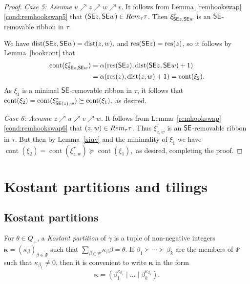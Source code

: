 \documentclass[Unicode,ALCO]{cedram}
\newcommand{\res}{\operatorname{res}}
\newcommand{\0}{{\bar 0}}
\newcommand{\dist}{{\mathrm {dist}}}
\newcommand{\ssee}{{\sf SE}}
\newcommand{\bkap}{\boldsymbol{\kappa}}
\def\cont{{\operatorname{cont}}}
\begin{document}
\begin{proof}
{\em Case 5: Assume \(u \nearrow z \nearrow w \nearrow v\)}. It follows from Lemma~\ref{remhookswap}\eqref{cond:remhookswap5} that \((\ssee z, \ssee w) \in \textup{Rem}_\tau\tau\). Then \(\xi^\tau_{\ssee z, \ssee w}\) is an \(\ssee\)-removable ribbon in \(\tau\). 

We have
\(
 \dist(\ssee z,\ssee w) = \dist (z,w),
\)
 and
\(
 \res(\ssee z) = \res(z)
\), so it follows by Lemma~\ref{hookcont} that 
 \begin{align*}
 \cont(\xi^\tau_{\ssee z,\ssee w}) &= \alpha(\res(\ssee z), \dist(\ssee z,\ssee w)+1)\\
 &= \alpha(\res(z),\dist(z,w)+1) = \cont(\xi_2).
 \end{align*}
As \(\xi_1\) is a minimal \(\ssee\)-removable ribbon in \(\tau\), it follows that
\(
\cont(\xi_2) = \cont(\xi^\tau_{\ssee(z),w}) \succeq \cont(\xi_1),
\)
as desired.

{\em Case 6: Assume \(z \nearrow u \nearrow v \nearrow w\)}.  It follows from Lemma~\ref{remhookswap}\eqref{cond:remhookswap6} that \((z, w) \in \textup{Rem}_\tau\tau\). Thus \(\xi^\tau_{z,w}\) is an \(\ssee\)-removable ribbon in \(\tau\). 
But then by Lemma~\ref{xiuv} and the minimality of \(\xi_1\) we have
\(
\cont(\xi_2) =\cont(\xi^\tau_{z,w}) \succeq \cont(\xi_1),
\)
as desired, completing the proof. 
\end{proof}

\section{Kostant partitions and tilings}\label{Kostsec}



\subsection{Kostant partitions}
For \(\theta \in Q_+\), a {\em Kostant partition} of \(\gamma\) is a tuple of non-negative integers \(\bkap = (\kappa_\beta)_{\beta \in \Psi}\) such that \(\sum_{\beta \in \Psi} \kappa_\beta \beta = \theta\). If \(\beta_1 \succ \cdots \succ \beta_k\) are the members of \(\Psi\) such that \(\kappa_{\beta_1} \neq 0\), then it is convenient to write \(\bkap\) in the form
\begin{align*}
\bkap = 
(\beta_1^{\kappa_{\beta_1}} \mid \ldots \mid \beta_k^{\kappa_{\beta_k}}).
\end{align*}
\end{document}
